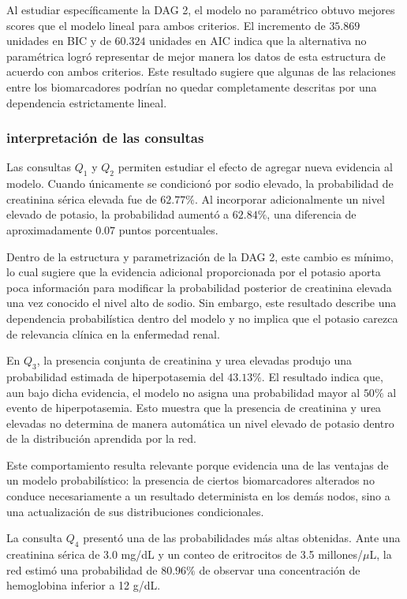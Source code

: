 \documentclass{Academic}
\begin{document}
Al estudiar específicamente la DAG 2, el modelo no paramétrico obtuvo mejores
scores que el modelo lineal para ambos criterios. El incremento de $35.869$
unidades en BIC y de $60.324$ unidades en AIC indica que la alternativa no
paramétrica logró representar de mejor manera los datos de esta estructura
de acuerdo con ambos criterios. Este resultado sugiere que algunas de las
relaciones entre los biomarcadores podrían no quedar completamente descritas
por una dependencia estrictamente lineal.

\subsubsection{interpretación de las consultas}
Las consultas $Q_1$ y $Q_2$ permiten estudiar el efecto de agregar nueva
evidencia al modelo. Cuando únicamente se condicionó por sodio elevado,
la probabilidad de creatinina sérica elevada fue de $62.77\%$. Al incorporar
adicionalmente un nivel elevado de potasio, la probabilidad aumentó a
$62.84\%$, una diferencia de aproximadamente $0.07$ puntos porcentuales.

Dentro de la estructura y parametrización de la DAG 2, este cambio es
mínimo, lo cual sugiere que la evidencia adicional proporcionada por el
potasio aporta poca información para modificar la probabilidad posterior
de creatinina elevada una vez conocido el nivel alto de sodio. Sin embargo,
este resultado describe una dependencia probabilística dentro del modelo y
no implica que el potasio carezca de relevancia clínica en la enfermedad
renal.

En $Q_3$, la presencia conjunta de creatinina y urea elevadas produjo una
probabilidad estimada de hiperpotasemia del $43.13\%$. El resultado indica
que, aun bajo dicha evidencia, el modelo no asigna una probabilidad mayor
al $50\%$ al evento de hiperpotasemia. Esto muestra que la presencia de
creatinina y urea elevadas no determina de manera automática un nivel
elevado de potasio dentro de la distribución aprendida por la red.

Este comportamiento resulta relevante porque evidencia una de las ventajas
de un modelo probabilístico: la presencia de ciertos biomarcadores alterados
no conduce necesariamente a un resultado determinista en los demás nodos,
sino a una actualización de sus distribuciones condicionales.

La consulta $Q_4$ presentó una de las probabilidades más altas obtenidas.
Ante una creatinina sérica de 3.0 mg/dL y un conteo de eritrocitos de
3.5 millones/$\mu$L, la red estimó una probabilidad de $80.96\%$ de observar
una concentración de hemoglobina inferior a 12 g/dL.
\end{document}
